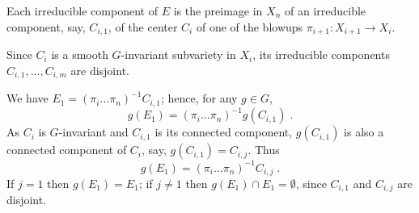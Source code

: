 \begin{pf}
Each irreducible component of $E$ is the preimage in $X_n$ of an irreducible
component, say, $C_{i,1}$, of the center $C_i$ of one of the blowups
$\pi_{i+1}\colon X_{i+1}\to X_{i}$.

Since $C_i$ is a smooth $G$-invariant subvariety in $X_{i}$,
its irreducible components $C_{i,1},\dots,C_{i,m}$ are disjoint.

We have $E_1=(\pi_i\dots\pi_n)^{-1}C_{i,1}$; hence,
for any $g\in G$, \[ g(E_1)=(\pi_i\dots\pi_n)^{-1}g(C_{i,1}) \; . \]
As $C_i$ is $G$-invariant and $C_{i,1}$ is its connected component, 
$g(C_{i,1})$
is also a connected component of $C_i$, say, $g(C_{i,1})=C_{i,j}$. Thus 
\[ g(E_1)=(\pi_i\dots\pi_n)^{-1}C_{i,j} \; . \]
If $j=1$ then $g(E_1) = E_1$; if $j\ne1$ then $g(E_1) \cap E_1 = \emptyset$,
since $C_{i,1}$ and $C_{i,j}$ are disjoint.
\end{pf}

